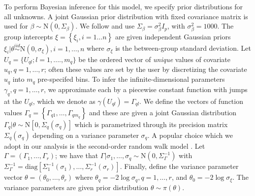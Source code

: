 \documentclass[]{article}
\begin{document}
To perform Bayesian inference for this model, we specify prior distributions for all unknowns. A joint Gaussian prior distribution with fixed covariance matrix is used for $\beta \sim  \text{N}(0,\Sigma_\beta)$. We follow \citet{casecross} and use $\Sigma_{\beta} = \sigma^{2}_{\beta}I_{p}$, with $\sigma^{2}_{\beta} = 1000$. The group intercepts $\xi = \left\{ \xi_{i}, i = 1\ldots n\right\}$ are given independent Gaussian priors $\xi_{i} | \theta \stackrel{iid}{\sim} \text{N}(0,\sigma_{\xi}),i = 1,\ldots,n$ where $\sigma_{\xi}$ is the between-group standard deviation. Let $U_{q} = \{U_{ql};l = 1, ...., m_q\}$ be the ordered vector of \textit{unique} values of covariate $u_q,q = 1,\ldots,r$; often these values are set by the user by discretizing the covariate $u_q$ into $m_q$ pre-specifed bins. To infer the infinite-dimensional parameters $\gamma_{q},q = 1,\ldots,r$, we approximate each by a piecewise constant function with jumps at the $U_{ql}$, which we denote as $\gamma(U_{ql}) = \Gamma_{ql}$. We define the vectors of function values $\Gamma_{q} = \left\{ \Gamma_{q1},\ldots,\Gamma_{qm_{q}}\right\}$ and these are given a joint Gaussian distribution $\Gamma_{q}|\theta\sim\text{N}\left[ 0,\Sigma_{q}(\sigma_{q})\right]$ which is parametrized through its precision matrix $\Sigma_{q}(\sigma_{q})$ depending on a variance parameter $\sigma_{q}$. A popular choice which we adopt in our analysis is the second-order random walk model \citep{rw2}. Let $\Gamma = (\Gamma_{1},\ldots,\Gamma_{r})$; we have that $\Gamma|\sigma_{1},\ldots,\sigma_{q}\sim\text{N}\left( 0,\Sigma^{-1}_{\Gamma}\right)$ with $\Sigma^{-1}_{\Gamma} = \text{diag}\left[ \Sigma_{1}^{-1}(\sigma_{1}),\ldots,\Sigma_{r}^{-1}(\sigma_{r})\right]$. Finally, define the variance parameter vector $\theta = (\theta_{0},\ldots,\theta_{r})$ where $\theta_{q} = -2\log\sigma_{q},q = 1,\ldots,r$, and $\theta_{0} = -2\log\sigma_{\xi}$. The variance parameters are given prior distribution $\theta \sim \pi(\theta)$. 
\end{document}
